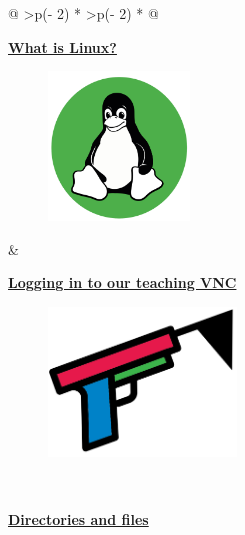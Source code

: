 \documentclass[
  letterpaper,
  DIV=11,
  numbers=noendperiod]{scrreprt}
\begin{document}
\begin{longtable}[]{@{}
  >{\centering\arraybackslash}p{(\columnwidth - 2\tabcolsep) * }
  >{\centering\arraybackslash}p{(\columnwidth - 2\tabcolsep) * }@{}}
\toprule\noalign{}
\endhead
\bottomrule\noalign{}
\endlastfoot
\begin{minipage}[t]{\linewidth}\centering
\protect\hyperlink{linuxintro}{\textbf{What is Linux?}}

\begin{figure}

{\centering 

\protect\hyperlink{linuxintro}{\includegraphics[width=1.47917in,height=\textheight]{figures/linux_beginner.png}}

}

\end{figure}
\end{minipage} & \begin{minipage}[t]{\linewidth}\centering
\protect\hyperlink{cluster}{\textbf{Logging in to our teaching VNC}}

\begin{figure}

{\centering 

\protect\hyperlink{cluster}{\includegraphics[width=1.96875in,height=\textheight]{figures/start.png}}

}

\end{figure}
\end{minipage} \\
\begin{minipage}[t]{\linewidth}\centering
\protect\hyperlink{dirsandfiles}{\textbf{Directories and files}}


\end{minipage}
\end{longtable}
\end{document}
